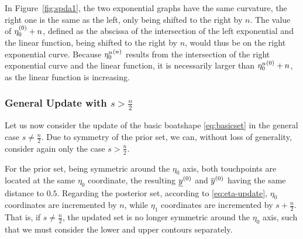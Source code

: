 In Figure~\ref{fig:spda1}, the two exponential graphs have the same curvature,
the right one is the same as the left, only being shifted to the right by $n$.
The value of $\eta_0^{(0)} + n$, defined as the abscissa of the intersection of the left exponential and the linear function,
being shifted to the right by $n$, would thus be on the right exponential curve.
Because ${\eta_0^u}^{(n)}$ results from the intersection of the right exponential curve and the linear function,
it is necessarily larger than ${\eta_0^u}^{(0)} + n$, as the linear function is increasing.


\subsubsection{General Update with \texorpdfstring{$s > \frac{n}{2}$}{s > n/2}}
\label{sec:generalupdate}

Let us now consider the update of the basic boatshape \eqref{eq:basicset} %
in the general case $s \neq \frac{n}{2}$.
Due to symmetry of the prior set, we can, without loss of generality,
consider again only the case $s > \frac{n}{2}$.

For the prior set, being symmetric around the $\eta_0$ axis,
both touchpoints are located at the same $\eta_0$ coordinate,
the resulting $\underline{y}^{(0)}$ and $\overline{y}^{(0)}$ having the same distance to $0.5$.
Regarding the posterior set, according to \eqref{eq:eta-update},
$\eta_0$ coordinates are incremented by $n$, while
$\eta_1$ coordinates are incremented by $s+\frac{n}{2}$.
That is, if $s \neq \frac{n}{2}$, the updated set is no longer symmetric around the $\eta_0$ axis,
such that we must consider the lower and upper contours separately.

